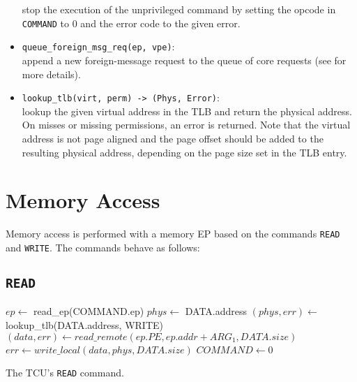 \begin{itemize}
  stop the execution of the unprivileged command by setting the opcode in \texttt{COMMAND} to 0 and
  the error code to the given error.
  \item \texttt{queue\_foreign\_msg\_req(ep, vpe)}:\\
  append a new foreign-message request to the queue of core requests (see
   for more details).\extend{}
  \item \texttt{lookup\_tlb(virt, perm) -> (Phys, Error)}:\\
  lookup the given virtual address in the TLB and return the physical address. On misses or missing
  permissions, an error is returned. Note that the virtual address is not page aligned and the page
  offset should be added to the resulting physical address, depending on the page size set in the
  TLB entry.\extend{}
\end{itemize}

\section{Memory Access}

Memory access is performed with a memory EP based on the commands \texttt{READ} and \texttt{WRITE}.
The commands behave as follows:

\subsection{\texttt{READ}}

\begin{algorithm}[H]
    $ep \gets$ read\_ep(COMMAND.ep)\;
    \extend{}
    \BlankLine
    $phys \gets$ DATA.address\;
    $(phys, err) \gets$ lookup\_tlb(DATA.address, WRITE)\;
    \extend{}
    \BlankLine
    $(data, err) \gets read\_remote(ep.PE, ep.addr + ARG_1, DATA.size)$\;
    \extend{}
    $err \gets write\_local(data, phys, DATA.size)$\;
    \extend{}
    \BlankLine
    $COMMAND \gets 0$\;
    \caption{The TCU's \texttt{READ} command.}
\end{algorithm}

